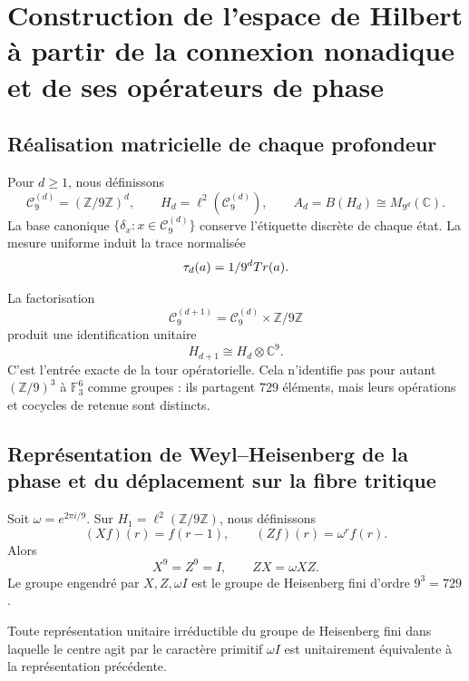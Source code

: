 \label{chap:83-21}



\section{Construction de l'espace de Hilbert à partir de la connexion nonadique et de ses opérateurs de phase}

\subsection{Réalisation matricielle de chaque profondeur}

Pour \(d\ge1\), nous définissons
\[
  \mathcal C_9^{(d)}=(\mathbb Z/9\mathbb Z)^d,
  \qquad
  H_d=\ell^2(\mathcal C_9^{(d)}),
  \qquad
  A_d=B(H_d)\cong M_{9^d}(\mathbb C).
\]
La base canonique \(\{\delta_x:x\in\mathcal C_9^{(d)}\}\) conserve
l’étiquette discrète de chaque état. La mesure uniforme induit la trace
normalisée
\[
  \tau_d(a)=1/9^dTr(a).
\]

La factorisation
\[
  \mathcal C_9^{(d+1)}
  =
  \mathcal C_9^{(d)}\times\mathbb Z/9\mathbb Z
\]
produit une identification unitaire
\[
  H_{d+1}\cong H_d\otimes\mathbb C^9.
\]
C’est l’entrée exacte de la tour opératorielle. Cela n’identifie pas pour autant
\((\mathbb Z/9)^3\) à \(\mathbb F_3^6\) comme groupes : ils partagent \(729\)
éléments, mais leurs opérations et cocycles de retenue sont distincts.

\subsection{Représentation de Weyl–Heisenberg de la phase et du déplacement sur la fibre tritique}

Soit \(\omega=e^{2\pi i/9}\). Sur
\(H_1=\ell^2(\mathbb Z/9\mathbb Z)\), nous définissons
\[
  (Xf)(r)=f(r-1),
  \qquad
  (Zf)(r)=\omega^r f(r).
\]
Alors
\[
  X^9=Z^9=I,
  \qquad
  ZX=\omega XZ.
\]
Le groupe engendré par \(X,Z,\omega I\) est le groupe de Heisenberg fini
d’ordre \(9^3=729\).

\begin{theorem}
Toute représentation unitaire irréductible du groupe de Heisenberg fini dans
laquelle le centre agit par le caractère primitif
\(\omega I\) est unitairement équivalente à la représentation précédente.
\end{theorem}

